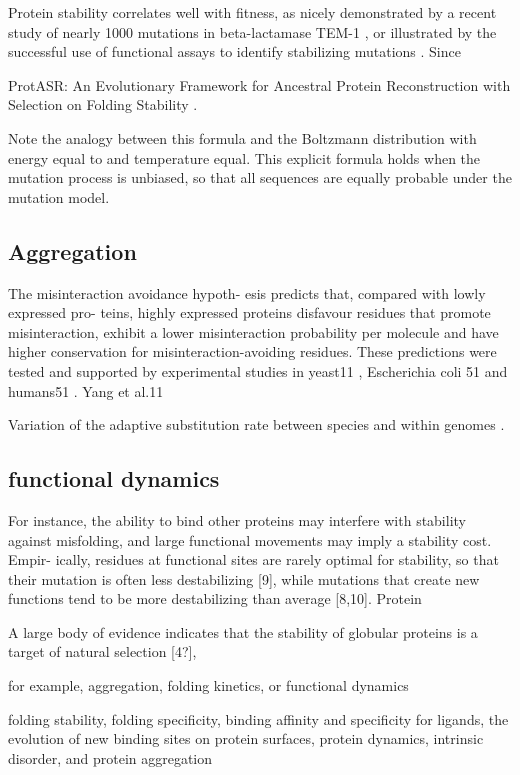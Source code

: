 Protein stability correlates well with fitness, as nicely demonstrated by a recent study of nearly 1000 mutations in beta-lactamase TEM-1 \citep{Jacquier2013}, or illustrated by the successful use of functional assays to identify stabilizing mutations \citep{Araya2012}. Since

ProtASR: An Evolutionary Framework for Ancestral Protein Reconstruction with Selection on Folding Stability \citep{Arenas2017}.

Note the analogy between this formula and the Boltzmann distribution with energy equal to and temperature equal. This explicit formula holds when the mutation process is unbiased, so that all sequences are equally probable under the mutation model. 

\subsection{Aggregation}

The misinteraction avoidance hypoth- esis predicts that, compared with lowly expressed pro- teins, highly expressed proteins disfavour residues that promote misinteraction, exhibit a lower misinteraction probability per molecule and have higher conservation for misinteraction-avoiding residues. These predictions were tested and supported by experimental studies in yeast11
, Escherichia coli 51 and humans51 . Yang et al.11

Variation of the adaptive \gls{substitution} rate between species and within genomes \citep{Moutinho2019}.


\subsection{functional dynamics}


For instance, the ability to bind other proteins may interfere with stability against misfolding, and large functional movements may imply a stability cost. Empir- ically, residues at functional sites are rarely optimal for stability, so that their mutation is often less destabilizing [9], while mutations that create new functions tend to be more destabilizing than average [8,10].
Protein

A large body of evidence indicates that the stability of globular proteins is a target of natural selection [4?], \citep{Sikosek2014} 
 
for example, aggregation, folding kinetics, or functional dynamics \citep{Bastolla2017}

folding stability, folding specificity, binding affinity and specificity for ligands, the evolution of new binding sites on protein surfaces, protein dynamics, intrinsic disorder, and protein aggregation \citep{Chi2016}